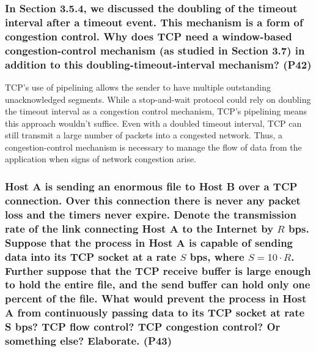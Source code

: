 

\subsubsection{In Section 3.5.4, we discussed the doubling of the timeout interval after a timeout event. This mechanism is a form of congestion control. Why does TCP need a window-based congestion-control mechanism (as studied in  Section 3.7) in addition to this doubling-timeout-interval mechanism? (P42)}

TCP's use of pipelining allows the sender to have multiple outstanding unacknowledged segments. While a stop-and-wait protocol could rely on doubling the timeout interval as a congestion control mechanism, TCP's pipelining means this approach wouldn't suffice. Even with a doubled timeout interval, TCP can still transmit a large number of packets into a congested network. Thus, a congestion-control mechanism is necessary to manage the flow of data from the application when signs of network congestion arise.



\subsubsection{Host A is sending an enormous file to Host B over a TCP connection. Over this connection there is never any packet loss and the timers never expire. Denote the transmission rate of the link connecting Host A to the Internet by $R$ bps. Suppose that the process in Host A is capable of sending data into its TCP socket at a rate $S$ bps, where $S = 10 \cdot R$. Further suppose that the TCP receive buffer is large enough to hold the entire file, and the send buffer can hold only one percent of the file. What would prevent the process in Host A from continuously passing data to its TCP socket at rate S bps? TCP flow control? TCP congestion control? Or something else? Elaborate. (P43)}

